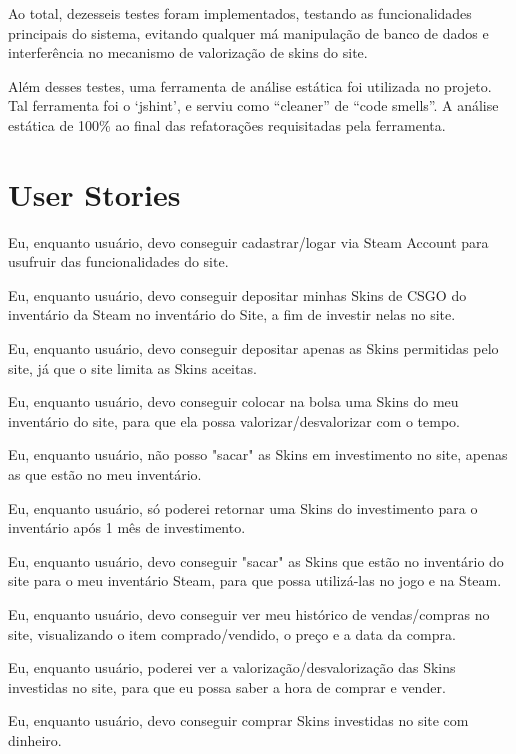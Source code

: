 \documentclass[a4paper,12pt]{article}
\begin{document}
    Ao total, dezesseis testes foram implementados, testando as funcionalidades principais do sistema, 
    evitando qualquer má manipulação de banco de dados e interferência no mecanismo de valorização de
     skins do site.
    
    Além desses testes, uma ferramenta de análise estática foi utilizada no projeto. Tal ferramenta 
    foi o ‘jshint’, e serviu como “cleaner” de “code smells”. A análise estática de 100\% ao final 
    das refatorações requisitadas pela ferramenta.

    \section{User Stories}
    Eu, enquanto usuário, devo conseguir cadastrar/logar via Steam Account para usufruir das 
    funcionalidades do site.

    Eu, enquanto usuário, devo conseguir depositar minhas Skins de CSGO do inventário da Steam no 
    inventário do Site, a fim de investir nelas no site.

    Eu, enquanto usuário, devo conseguir depositar apenas as Skins permitidas pelo site, já que o 
    site limita as Skins aceitas.

    Eu, enquanto usuário, devo conseguir colocar na bolsa uma Skins do meu inventário do site, para 
    que ela possa valorizar/desvalorizar com o tempo.

    Eu, enquanto usuário, não posso "sacar" as Skins em investimento no site, apenas as que estão no 
    meu inventário.

    Eu, enquanto usuário, só poderei retornar uma Skins do investimento para o inventário após 1 mês 
    de investimento.

    Eu, enquanto usuário, devo conseguir "sacar" as Skins que estão no inventário do site para o meu 
    inventário Steam, para que possa utilizá-las no jogo e na Steam.

    Eu, enquanto usuário, devo conseguir ver meu histórico de vendas/compras no site, visualizando o 
    item comprado/vendido, o preço e a data da compra.

    Eu, enquanto usuário, poderei ver a valorização/desvalorização das Skins investidas no site, para 
    que eu possa saber a hora de comprar e vender.

    Eu, enquanto usuário, devo conseguir comprar Skins investidas no site com dinheiro.
\end{document}
